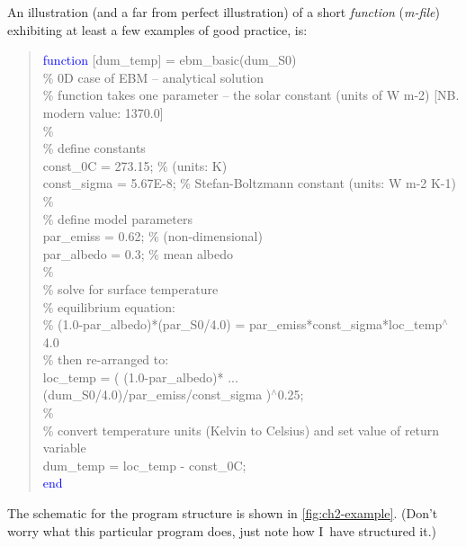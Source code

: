 \documentclass{tufte-book} %
\newenvironment{docspecmargin}{\begin{quotation}\ttfamily\footnotesize\parskip0pt\parindent0pt\ignorespaces}{\end{quotation}}
\begin{document}
\noindent An illustration (and a far from perfect illustration) of a short \textit{function} (\textit{m-file}) exhibiting at least a few examples of good practice, is:

\begin{docspecmargin}
\textcolor{blue}{function} [dum\_temp] = ebm\_basic(dum\_S0)
\textcolor[rgb]{0,0.501961,0}{\\\% 0D case of EBM -- analytical solution
\\\% function takes one parameter -- the solar constant (units of W m-2) [NB. modern value: 1370.0]
\\\% 
\\\% define constants}
\\const\_0C = 273.15; \textcolor[rgb]{0,0.501961,0}{\% (units: K)}
\\const\_sigma = 5.67E-8; \textcolor[rgb]{0,0.501961,0}{\% Stefan-Boltzmann constant (units: W m-2 K-1)}
\textcolor[rgb]{0,0.501961,0}{\\\% 
\\\% define model parameters}
\\par\_emiss = 0.62; \textcolor[rgb]{0,0.501961,0}{\% (non-dimensional)}
\\par\_albedo = 0.3; \textcolor[rgb]{0,0.501961,0}{\% mean albedo}
\textcolor[rgb]{0,0.501961,0}{\\\% 
\\\% solve for surface temperature
\\\% equilibrium equation:
\\\% (1.0-par\_albedo)*(par\_S0/4.0) = par\_emiss*const\_sigma*loc\_temp\(^{\wedge}\)4.0
\\\% then re-arranged to:}
\\loc\_temp = ( (1.0-par\_albedo)* ...
\\(dum\_S0/4.0)/par\_emiss/const\_sigma )\(^{\wedge}\)0.25;
\textcolor[rgb]{0,0.501961,0}{\\\% 
\\\% convert temperature units (Kelvin to Celsius) and set value of return variable}
\\dum\_temp = loc\_temp - const\_0C;
\textcolor{blue}{\\end}
\end{docspecmargin} 

\noindent The schematic for the program structure is shown in \ref{fig:ch2-example}. (Don't worry what this particular program does, just note how I\ have structured it.)
\end{document}
